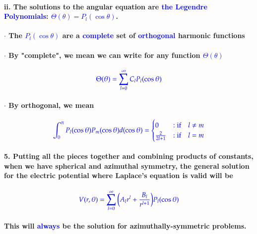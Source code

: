 \documentclass{article}
\begin{document}
\paragraph{\indent\indent ii. The solutions to the angular equation are \textcolor{blue}{the Legendre Polynomials}: \textcolor{blue}{$\Theta(\theta)=P_l(\cos\theta)$}.}
\paragraph{\indent\indent $\cdot$ The \textcolor{blue}{$P_l(\cos\theta)$} are a \textcolor{blue}{complete} set of \textcolor{blue}{orthogonal} harmonic functions}
\paragraph{\indent\indent $\cdot$ By "complete", we mean we can write for any function \textcolor{blue}{$\Theta(\theta)$}}
\begin{equation*}
    \textcolor{blue}{\Theta(\theta)=\sum_{l=0}^{\infty}C_lP_l(\cos\theta)}
\end{equation*}
\paragraph{\indent\indent $\cdot$ By orthogonal, we mean}
\begin{equation*}
    \textcolor{blue}{\int_0^{\pi}P_l(\cos\theta)P_m(\cos\theta)d(\cos\theta)=\begin{cases}
        0 &: \text{if}\quad l\neq m \\
        \frac{2}{2l+1} &:  \text{if}\quad l=m\\
    \end{cases}}
\end{equation*}
\paragraph{5. Putting all the pieces together and combining products of constants, when we have spherical and azimuthal symmetry, the general solution for the electric potential where Laplace's equation is valid will be}
\begin{equation*}
    \textcolor{blue}{V(r,\theta)=\sum_{l=0}^{\infty}\bigg(A_lr^l+\frac{B_l}{r^{l+1}}\bigg)P_l(\cos\theta)}
\end{equation*}
\paragraph{\indent This will \textcolor{blue}{always} be the solution for azimuthally-symmetric problems.}
\end{document}
